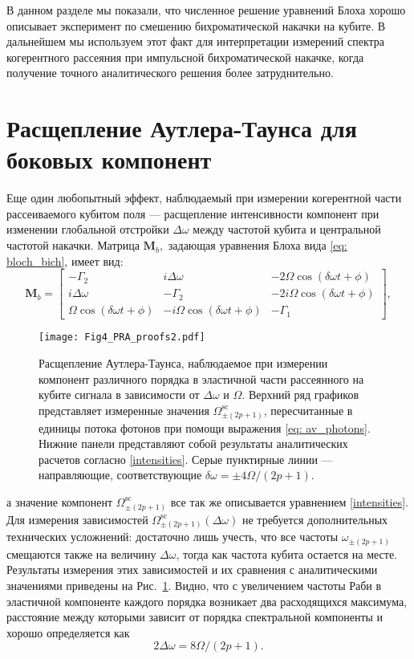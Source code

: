 В данном разделе мы показали, что численное решение уравнений Блоха хорошо описывает эксперимент по смешению бихроматической накачки на кубите. В дальнейшем мы используем этот факт для интерпретации измерений спектра когерентного рассеяния при импульсной бихроматической накачке, когда получение точного аналитического решения более затруднительно.
 
\section{Расщепление Аутлера-Таунса для боковых компонент}
Еще один любопытный эффект, наблюдаемый при измерении когерентной части рассеиваемого кубитом поля --- расщепление интенсивности компонент при изменении глобальной отстройки $\Delta\omega$ между частотой кубита и центральной частотой накачки. Матрица $\mathbf{M}_b,$ задающая уравнения Блоха вида \eqref{eq: bloch_bich}, имеет вид:
$$
\mathbf{M}_b = \left[\begin{matrix}- \Gamma_2 & i \Delta\omega & - 2 \Omega \cos{\left(\delta\omega t + \phi \right)}\\i \Delta\omega & - \Gamma_{2} & - 2 i \Omega \cos{\left(\delta\omega t + \phi \right)}\\\Omega \cos{\left(\delta\omega t + \phi \right)} & - i \Omega \cos{\left(\delta\omega t + \phi \right)} & - \Gamma_1\end{matrix}\right],
$$
\begin{figure}[th]\label{fig: autler-townes like}
	\centering
	\texttt{[image: Fig4\_PRA\_proofs2.pdf]}
	\caption[Расщепление Аутлера-Таунса боковых компонент эластичной части рассеянного на кубите сигнала.]{Расщепление Аутлера-Таунса, наблюдаемое при измерении компонент различного порядка в эластичной части рассеянного на кубите сигнала в зависимости от $\Delta\omega$ и $\Omega$. Верхний ряд графиков представляет измеренные значения $\Omega_{\pm(2p+1)}^{\text{sc}}$, пересчитанные в единицы потока фотонов при помощи выражения \eqref{eq: av_photons}. Нижние панели представляют собой результаты аналитических расчетов согласно \eqref{intensities}. Серые пунктирные линии --- направляющие, соответствующие $\delta\omega = \pm 4\Omega/(2p+1)$. }
\end{figure}
а значение компонент $\Omega_{\pm(2p+1)}^{\text{sc}}$ все так же описывается уравнением \eqref{intensities}. Для измерения зависимостей $\Omega_{\pm(2p+1)}^{\text{sc}}(\Delta\omega)$ не требуется дополнительных технических усложнений: достаточно лишь учесть, что все частоты $\omega_{\pm(2p+1)}$ смещаются также на величину $\Delta\omega$, тогда как частота кубита остается на месте. Результаты измерения этих зависимостей и их сравнения с аналитическими значениями приведены на Рис.~\ref{fig: autler-townes like}. Видно, что с увеличением частоты Раби в эластичной компоненте каждого порядка возникает два расходящихся максимума, расстояние между которыми зависит от порядка спектральной компоненты и хорошо определяется как 
\begin{equation}\label{ATS-like}
	2\Delta\omega = 8\Omega/(2p+1). 
\end{equation}

